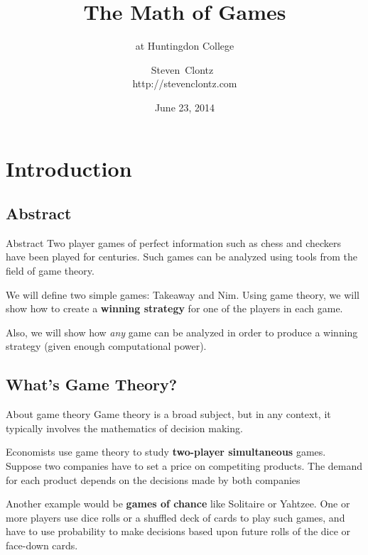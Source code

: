 \documentclass{beamer}
\title
{The Math of Games}
\subtitle
{at Huntingdon College} %
\author%
{Steven~Clontz~\\http://stevenclontz.com}%
\institute[Auburn University] %
{
  Department of Mathematics and Statistics\\
  Auburn University}
\date[14-06-23] %
{June 23, 2014}
\theoremstyle{theorem}
\theoremstyle{definition}
\newcommand{\<}{\langle}
\renewcommand{\>}{\rangle}
\newcommand{\vpause}{\pause\vspace{1em}}
\newcommand{\term}[1]{\textbf{#1}}
\begin{document}
\renewcommand{\pause}{}

\begin{frame}
  \titlepage
\end{frame}


\section{Introduction}

\subsection{Abstract}

\begin{frame}{Abstract}%
    \small
    Two player games of perfect information such as chess and checkers have
    been played for centuries. Such games can be analyzed using tools from
    the field of game theory.

    \vpause

    We will define two simple games: Takeaway and Nim.
    Using game theory, we will show how to create a \term{winning strategy}
    for one of the players in each game.

    \vpause

    Also, we will show how \textit{any} game can be analyzed in order
    to produce a winning strategy (given enough computational power).
\end{frame}

\subsection{What's Game Theory?}

\begin{frame}{About game theory}
  Game theory is a broad subject, but in any context, it typically involves the
  mathematics of decision making.

  \vpause

  Economists use game theory to study \term{two-player simultaneous}
  games. Suppose two companies have to set a price on competiting products.
  The demand for each product depends on the decisions made by both companies

  \vpause

  Another example would be \term{games of chance} like Solitaire or Yahtzee.
  One or more players use dice rolls or a shuffled deck of cards to play such
  games, and have to use probability to make decisions based upon future rolls
  of the dice or face-down cards.
\end{frame}
\end{document}
